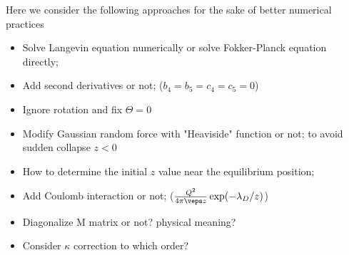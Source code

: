 
Here we consider the following approaches for the sake of better numerical practices
\begin{itemize}
  \item Solve Langevin equation numerically or solve Fokker-Planck equation directly;
  \item Add second derivatives or not; ($b_4 = b_5 = c_4 = c_5 = 0$)
  \item Ignore rotation and fix $\Theta = 0$
  \item Modify Gaussian random force with "Heaviside" function or not; to avoid sudden collapse $z<0$
  \item How to determine the initial $z$ value near the equilibrium position;
  \item Add Coulomb interaction or not; ($\frac{Q^2}{4\pi\veps z} \exp(-\lambda_D/z)$)
  \item Diagonalize M matrix or not? physical meaning?
  \item Consider $\kappa$ correction to which order?
\end{itemize}


